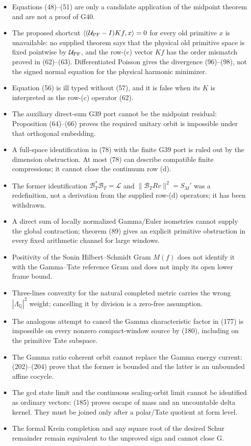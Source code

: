 \documentclass[11pt]{article}
\newcommand{\cL}{\mathscr L}
\begin{document}
\begin{itemize}
\item Equations (48)--(51) are only a candidate application of the midpoint
      theorem and are not a proof of G40.
\item The proposed shortcut
      $\langle(\mathcal U_{\rm PF}-I)Kf,x\rangle=0$ for every old primitive
      $x$ is unavailable: no supplied theorem says that the physical old
      primitive space is fixed pointwise by $\mathcal U_{\rm PF}$, and the
      row-(c) vector $Kf$ has the order mismatch proved in (62)--(63).
      Differentiated Poisson gives the divergence (96)--(98), not the signed
      normal equation for the physical harmonic minimizer.
\item Equation (56) is ill typed without (57), and it is false when its $K$ is
      interpreted as the row-(c) operator (62).
\item The auxiliary direct-sum G39 port cannot be the midpoint residual:
      Proposition (64)--(66) proves the required unitary orbit is impossible
      under that orthogonal embedding.
\item A full-space identification in (78) with the finite G39 port is ruled
      out by the dimension obstruction.  At most (78) can describe compatible
      finite compressions; it cannot close the continuum row (d).
\item The former identification
      $\mathcal B_T^*\mathcal B_T=\cL$ and
      $\|\mathcal B_TRv\|^2=S_M'$ was a redefinition, not a derivation from
      the supplied row-(d) operators; it has been withdrawn.
\item A direct sum of locally normalized Gamma/Euler isometries cannot supply
      the global contraction; theorem (89) gives an explicit primitive
      obstruction in every fixed arithmetic channel for large windows.
\item Positivity of the Sonin Hilbert--Schmidt Gram $M(f)$ does not identify
      it with the Gamma--Tate reference Gram and does not imply its open lower
      frame bound.
\item Three-lines convexity for the natural completed metric carries the
      wrong $|\Lambda_{\mathbb Q}|^2$ weight; cancelling it by division is a
      zero-free assumption.
\item The analogous attempt to cancel the Gamma characteristic factor in
      (177) is impossible on every nonzero compact-window source by (180),
      including on the primitive Tate subspace.
\item The Gamma ratio coherent orbit cannot replace the Gamma energy current:
      (202)--(204) prove that the former is bounded and the latter is an
      unbounded affine cocycle.
\item The gcd state limit and the continuous scaling-orbit limit cannot be
      identified as ordinary vectors: (185) proves escape of mass and an
      uncountable delta kernel.  They must be joined only after a polar/Tate
      quotient at form level.
\item The formal Krein completion and any square root of the desired Schur
      remainder remain equivalent to the unproved sign and cannot close G.
\end{itemize}
\end{document}
